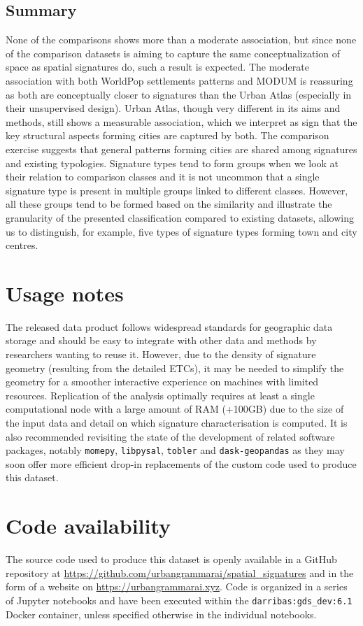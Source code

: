 \documentclass[fleqn,10pt]{wlscirep}
\begin{document}
\subsection*{Summary}
None of the comparisons shows more than a moderate association, but since none of the
comparison datasets is aiming to capture the same conceptualization of space as spatial
signatures do, such a result is expected. The moderate association with both WorldPop
settlements patterns and MODUM is reassuring as both are conceptually closer to
signatures than the Urban Atlas (especially in their unsupervised design). Urban Atlas,
though very different in its aims and methods, still shows a measurable association,
which we interpret as sign that the key structural aspects forming cities are captured by both. The
comparison exercise suggests that general patterns forming cities are shared among
signatures and existing typologies. Signature types tend to form groups when we look at
their relation to comparison classes and it is not uncommon that a single signature type
is present in multiple groups linked to different classes. However, all these groups
tend to be formed based on the similarity and illustrate the granularity of the
presented classification compared to existing datasets, allowing us to distinguish, for
example, five types of signature types forming town and city centres.
\section*{Usage notes}
The released data product follows widespread standards for geographic data storage and
should be easy to integrate with other data and methods by researchers wanting to reuse it. However, due to the density of
signature geometry (resulting from the detailed ETCs), it may be needed to simplify the
geometry for a smoother interactive experience on machines with limited resources.
Replication of the analysis optimally requires at least a single computational node with
a large amount of RAM (+100GB) due to the size of the input data and detail on which
signature characterisation is computed. It is also recommended revisiting the state of
the development of related software packages, notably
\texttt{momepy}\cite{fleischmann_2019}, \texttt{libpysal}\cite{rey2021pysal},
\texttt{tobler}\cite{eli_knaap_2021_5047613} and
\texttt{dask-geopandas} as they may soon offer more efficient drop-in replacements
of the custom code used to produce this dataset.
\section*{Code availability}
The source code used to produce this dataset is openly available in a GitHub repository
at \newline
\hyperlink{https://github.com/urbangrammarai/spatial\_signatures}{https://github.com/urbangrammarai/spatial\_signatures}
and in the form of a website on
\hyperlink{https://urbangrammarai.xyz}{https://urbangrammarai.xyz}.
Code is
organized in a series of Jupyter notebooks and have been executed within the
\texttt{darribas:gds\_dev:6.1}\cite{gds_env}
Docker container, unless specified otherwise in the individual notebooks.

\end{document}
